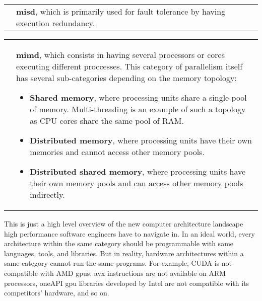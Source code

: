 \documentclass[main]{subfiles}
\begin{document}
\begin{center}
\begin{tabular}{ p{} p{} }

\raisebox{-.925\height}{}
&
\textbf{\gls{misd}}, which is primarily used for fault tolerance by having
execution redundancy.

\end{tabular}
\end{center}

\begin{center}
\begin{tabular}{ p{} p{} }

\raisebox{-.925\height}{}
&
\textbf{\gls{mimd}}, which consists in having several processors or cores
executing different proccesses. This category of parallelism itself has several
sub-categories depending on the memory topology:

\begin{itemize}
\item \textbf{Shared memory}, where processing units share a single
pool of memory. Multi-threading is an example of such a topology as
CPU cores share the same pool of RAM.

\item \textbf{Distributed memory}, where processing units have their own
memories and cannot access other memory pools.

\item \textbf{Distributed shared memory}, where processing units have their
own memory pools and can access other memory pools indirectly.
\end{itemize}

\end{tabular}
\end{center}

This is just a high level overview of the new computer architecture landscape
high performance software engineers have to navigate in.
In an ideal world, every architecture within the same category
should be programmable with same languages, tools, and libraries.
But in reality, hardware architectures within a same category
cannot run the same programs.
For example, CUDA is not compatible with AMD \glspl{gpu}, \gls{avx} instructions
are not available on ARM processors, oneAPI \gls{gpu} libraries developed by
Intel are not compatible with its competitors' hardware, and so on.
\end{document}
